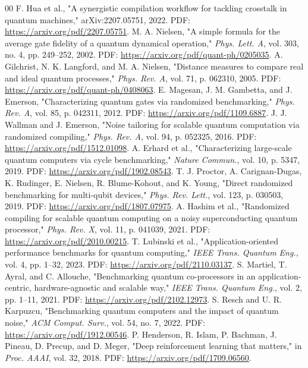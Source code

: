 \documentclass[conference]{IEEEtran}
\begin{document}
\begin{thebibliography}{00}
 F. Hua et al., "A synergistic compilation workflow for tackling crosstalk in quantum machines," arXiv:2207.05751, 2022. PDF: \url{https://arxiv.org/pdf/2207.05751}.
 M. A. Nielsen, "A simple formula for the average gate fidelity of a quantum dynamical operation," \emph{Phys. Lett. A}, vol. 303, no. 4, pp. 249--252, 2002. PDF: \url{https://arxiv.org/pdf/quant-ph/0205035}.
 A. Gilchrist, N. K. Langford, and M. A. Nielsen, "Distance measures to compare real and ideal quantum processes," \emph{Phys. Rev. A}, vol. 71, p. 062310, 2005. PDF: \url{https://arxiv.org/pdf/quant-ph/0408063}.
 E. Magesan, J. M. Gambetta, and J. Emerson, "Characterizing quantum gates via randomized benchmarking," \emph{Phys. Rev. A}, vol. 85, p. 042311, 2012. PDF: \url{https://arxiv.org/pdf/1109.6887}.
 J. J. Wallman and J. Emerson, "Noise tailoring for scalable quantum computation via randomized compiling," \emph{Phys. Rev. A}, vol. 94, p. 052325, 2016. PDF: \url{https://arxiv.org/pdf/1512.01098}.
 A. Erhard et al., "Characterizing large-scale quantum computers via cycle benchmarking," \emph{Nature Commun.}, vol. 10, p. 5347, 2019. PDF: \url{https://arxiv.org/pdf/1902.08543}.
 T. J. Proctor, A. Carignan-Dugas, K. Rudinger, E. Nielsen, R. Blume-Kohout, and K. Young, "Direct randomized benchmarking for multi-qubit devices," \emph{Phys. Rev. Lett.}, vol. 123, p. 030503, 2019. PDF: \url{https://arxiv.org/pdf/1807.07975}.
 A. Hashim et al., "Randomized compiling for scalable quantum computing on a noisy superconducting quantum processor," \emph{Phys. Rev. X}, vol. 11, p. 041039, 2021. PDF: \url{https://arxiv.org/pdf/2010.00215}.
 T. Lubinski et al., "Application-oriented performance benchmarks for quantum computing," \emph{IEEE Trans. Quantum Eng.}, vol. 4, pp. 1--32, 2023. PDF: \url{https://arxiv.org/pdf/2110.03137}.
 S. Martiel, T. Ayral, and C. Allouche, "Benchmarking quantum co-processors in an application-centric, hardware-agnostic and scalable way," \emph{IEEE Trans. Quantum Eng.}, vol. 2, pp. 1--11, 2021. PDF: \url{https://arxiv.org/pdf/2102.12973}.
 S. Resch and U. R. Karpuzcu, "Benchmarking quantum computers and the impact of quantum noise," \emph{ACM Comput. Surv.}, vol. 54, no. 7, 2022. PDF: \url{https://arxiv.org/pdf/1912.00546}.
 P. Henderson, R. Islam, P. Bachman, J. Pineau, D. Precup, and D. Meger, "Deep reinforcement learning that matters," in \emph{Proc. AAAI}, vol. 32, 2018. PDF: \url{https://arxiv.org/pdf/1709.06560}.

\end{thebibliography}
\end{document}
